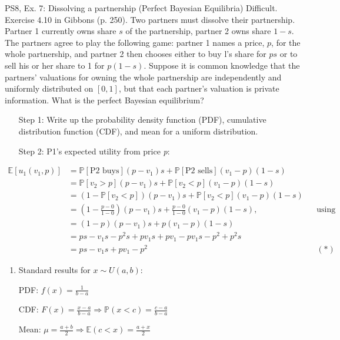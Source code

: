 \begin{frame}{PS8, Ex. 7: Dissolving a partnership (Perfect Bayesian Equilibria)}
    Difficult. Exercise 4.10 in Gibbons (p. 250). Two partners must dissolve their partnership. Partner 1 currently owns share $s$ of the partnership, partner 2 owns share $1-s$. The partners agree to play the following game: partner 1 names a price, $p$, for the whole partnership, and partner 2 then chooses either to buy l's share for $ps$ or to sell his or her share to 1 for $p(1-s)$. Suppose it is common knowledge that the partners' valuations for owning the whole partnership are independently and uniformly distributed on $[0,1]$, but that each partner's valuation is private information. What is the perfect Bayesian equilibrium?\vspace{-11pt}
    \begin{multicols}{2}
      \begin{itemize}
        \item[Step 1:] Write up the probability density function (PDF), cumulative distribution function (CDF), and mean for a uniform distribution.
        \item[Step 2:] P1's expected utility from price \textit{p}:
      \end{itemize}\vspace{-8pt}
      \begin{align*}
          \mathbb{E}[u_1(v_1,p)]
            &=\mathbb{P}[\text{P2 buys}](p-v_1)s+\mathbb{P}[\text{P2 sells}](v_1-p)(1-s)\\
            &=\mathbb{P}[v_2>p](p-v_1)s+\mathbb{P}[v_2<p](v_1-p)(1-s)\\
            &=(1-\mathbb{P}[v_2<p])(p-v_1)s+\mathbb{P}[v_2<p](v_1-p)(1-s)\\
            &=\left(1-\frac{p-0}{1-0}\right)(p-v_1)s+\frac{p-0}{1-0}(v_1-p)(1-s),&&\text{using the CDF}\\
            &=\left(1-p\right)(p-v_1)s+p(v_1-p)(1-s)\\
            &=ps-v_1s-p^2s+pv_1s+pv_1-pv_1s-p^2+p^2s\\
            &=ps-v_1s+pv_1-p^2%
            &&(*)
      \end{align*}
      \vfill\null\columnbreak
      \begin{enumerate}
        \item Standard results for $x\sim U(a, b):$
        \item[PDF:]  $f(x)=\frac{1}{b-a}$
        \item[CDF:]  $F(x)=\frac{x-a}{b-a}\Rightarrow\mathbb{P}(x<c)=\frac{c-a}{b-a}$
        \item[Mean:] $\mu=\frac{a+b}{2}\Rightarrow\mathbb{E}(c<x)=\frac{a+x}{2}$
      \end{enumerate}
      \vfill\null
    \end{multicols}
\end{frame}
